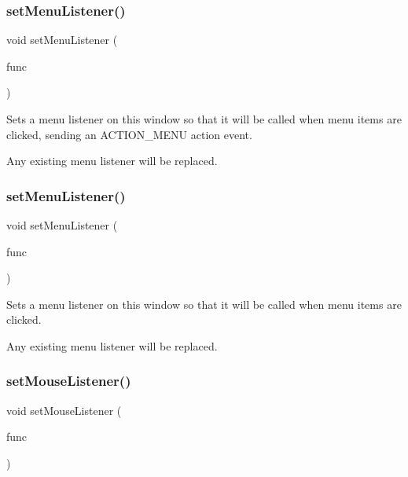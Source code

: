 \subsubsection{\texorpdfstring{set\+Menu\+Listener()}{setMenuListener()}\hspace{0.1cm}{\footnotesize\ttfamily [1/2]}}
{\footnotesize\ttfamily void set\+Menu\+Listener (\begin{DoxyParamCaption}\item[{G\+Event\+Listener}]{func }\end{DoxyParamCaption})\hspace{0.3cm}{\ttfamily [virtual]}}



Sets a menu listener on this window so that it will be called when menu items are clicked, sending an A\+C\+T\+I\+O\+N\+\_\+\+M\+E\+NU action event. 

Any existing menu listener will be replaced. \mbox{\label{classGWindow_a1294d48e67c30207da71c3e3ab56abde}} 
\subsubsection{\texorpdfstring{set\+Menu\+Listener()}{setMenuListener()}\hspace{0.1cm}{\footnotesize\ttfamily [2/2]}}
{\footnotesize\ttfamily void set\+Menu\+Listener (\begin{DoxyParamCaption}\item[{G\+Event\+Listener\+Void}]{func }\end{DoxyParamCaption})\hspace{0.3cm}{\ttfamily [virtual]}}



Sets a menu listener on this window so that it will be called when menu items are clicked. 

Any existing menu listener will be replaced. \mbox{\label{classGWindow_a37d8dbc943f59920f705b0104f60bde2}} 
\subsubsection{\texorpdfstring{set\+Mouse\+Listener()}{setMouseListener()}\hspace{0.1cm}{\footnotesize\ttfamily [1/2]}}
{\footnotesize\ttfamily void set\+Mouse\+Listener (\begin{DoxyParamCaption}\item[{G\+Event\+Listener}]{func }\end{DoxyParamCaption})\hspace{0.3cm}{\ttfamily [virtual]}}



